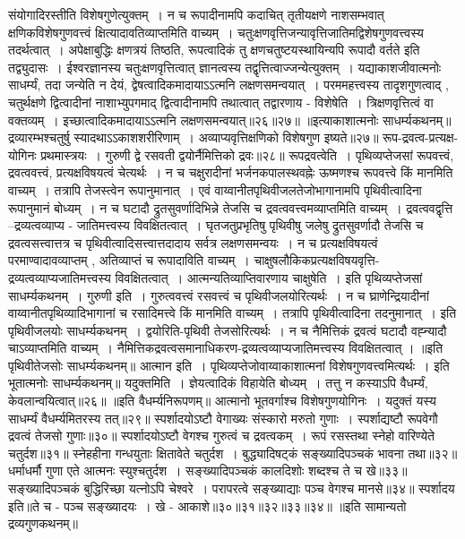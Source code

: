 संयोगादिरस्तीति विशेषगुणेत्युक्तम्~। न च रूपादीनामपि कदाचित् तृतीयक्षणे नाशसम्भवात् क्षणिकविशेषगुणवत्त्वं क्षित्यादावतिव्याप्तमिति वाच्यम्~।
चतुःक्षणवृत्तिजन्यावृत्तिजातिमद्विशेषगुणवत्त्वस्य तदर्थत्वात्~। अपेक्षाबुद्धिः क्षणत्रयं तिष्ठति, रूपत्वादिकं तु क्षणचतुष्टयस्थायिन्यपि रूपादौ वर्तते इति तद्व्युदासः~।
ईश्वरज्ञानस्य चतुःक्षणवृत्तित्वात् ज्ञानत्वस्य तद्वृत्तित्वाज्जन्येत्युक्तम्~। यद्याकाशजीवात्मनोः साधर्म्यं, तदा जन्येति न देयं, द्वेषत्वादिकमादायाऽऽत्मनि लक्षणसमन्वयात्~।
परममहत्त्वस्य तादृशगुणत्वाद् , चतुर्थक्षणे द्वित्वादीनां नाशाभ्युपगमाद् द्वित्वादीनामपि तथात्वात् तद्वारणाय - विशेषेति~। त्रिक्षणवृत्तित्वं वा वक्तव्यम्~। इच्छात्वादिकमादायाऽऽत्मनि
लक्षणसमन्वयात्॥२६॥२७॥
॥इत्याकाशात्मनोः साधर्म्यकथनम्॥
द्रव्यारम्भश्चतुर्षु स्यादथाऽऽकाशशरीरिणाम्~।
अव्याप्यवृत्तिक्षणिको विशेषगुण इष्यते॥२७॥
रूप-द्रवत्व-प्रत्यक्ष-योगिनः प्रथमास्त्रयः~।
गुरुणी द्वे रसवती द्वयोर्नैमित्तिको द्रवः॥२८॥
रूपद्रवत्वेति~। पृथिव्यप्तेजसां रूपवत्त्वं, द्रवत्ववत्त्वं, प्रत्यक्षविषयत्वं चेत्यर्थः~। न च चक्षुरादीनां भर्जनकपालस्थवह्नेः ऊष्मणश्च रूपवत्त्वे किं मानमिति वाच्यम्~।
तत्रापि तेजस्त्वेन रूपानुमानात्~। एवं वाय्वानीतपृथिवीजलतेजोभागानामपि पृथिवीत्वादिना रूपानुमानं बोध्यम्~।
न च घटादौ द्रुतसुवर्णादिभिन्ने तेजसि च द्रवत्ववत्त्वमव्याप्तमिति वाच्यम्~। द्रवत्ववद्वृत्ति --द्रव्यत्वव्याप्य - जातिमत्त्वस्य विवक्षितत्वात्~। घृतजतुप्रभृतिषु पृथिवीषु
जलेषु द्रुतसुवर्णादौ तेजसि च द्रवत्वसत्त्वात्तत्र च पृथिवीत्वादिसत्त्वात्तदादाय सर्वत्र लक्षणसमन्वयः~। न च प्रत्यक्षविषयत्वं परमाण्वादावव्याप्तम्  , अतिव्याप्तं च
रूपादाविति वाच्यम्~। चाक्षुषलौकिकप्रत्यक्षविषयवृत्ति-द्रव्यत्वव्याप्यजातिमत्त्वस्य विवक्षितत्वात्~। आत्मन्यतिव्याप्तिवारणाय चाक्षुषेति~।
इति पृथिव्यप्तेजसां साधर्म्यकथनम्~।
गुरुणी इति~। गुरुत्ववत्त्वं रसवत्त्वं च पृथिवीजलयोरित्यर्थः~। न च घ्राणेन्द्रियादीनां वाय्वानीतपृथिव्यादिभागानां च रसादिमत्त्वे किं मानमिति वाच्यम्~। तत्रापि
पृथिवीत्वादिना तदनुमानात्~।
इति पृथिवीजलयोः साधर्म्यकथनम्~।
द्वयोरिति-पृथिवी तेजसोरित्यर्थः~। न च नैमित्तिकं द्रवत्वं घटादौ वह्न्यादौ चाऽव्याप्तमिति वाच्यम्~। नैमित्तिकद्रवत्वसमानाधिकरण-द्रव्यत्वव्याप्यजातिमत्त्वस्य
विवक्षितत्वात् ।
॥इति पृथिवीतेजसोः साधर्म्यकथनम्॥
आत्मान इति~। पृथिव्यप्तेजोवाय्वाकाशात्मनां विशेषगुणवत्त्वमित्यर्थः~।
इति भूतात्मनोः साधर्म्यकथनम्॥
यदुक्तमिति~। ज्ञेयत्वादिकं विहायेति बोध्यम्~। तत्तु न कस्याऽपि वैधर्म्यं, केवलान्वयित्वात्॥२६॥
॥इति वैधर्म्यनिरूपणम्॥
आत्मानो भूतवर्गाश्च विशेषगुणयोगिनः~।
यदुक्तं यस्य साधर्म्यं वैधर्म्यमितरस्य तत्॥२९॥
स्पर्शादयोऽष्टौ वेगाख्यः संस्कारो मरुतो गुणाः~।
स्पर्शाद्यष्टौ रूपवेगौ द्रवत्वं तेजसो गुणाः॥३०॥
स्पर्शादयोऽष्टौ वेगश्च गुरुत्वं च द्रवत्वकम्~।
रूपं रसस्तथा स्नेहो वारिण्येते चतुर्दश॥३१॥
स्नेहहीना गन्धयुताः क्षितावेते चतुर्दश~।
बुद्ध्यादिषट्कं सङ्ख्यादिपञ्चकं भावना तथा॥३२॥
धर्माधर्मौ गुणा एते आत्मनः स्युश्चतुर्दश~।
सङ्ख्यादिपञ्चकं कालदिशोः शब्दश्च ते च खे॥३३॥
सङ्ख्यादिपञ्चकं बुद्धिरिच्छा यत्नोऽपि चेश्वरे~।
परापरत्वे सङ्ख्याद्याः पञ्च वेगश्च मानसे॥३४॥
स्पर्शादय इति॥ते च - पञ्च सङ्ख्यादयः~। खे - आकाशे॥३०॥३१॥३२॥३३॥३४॥
॥इति सामान्यतो द्रव्यगुणकथनम्॥




